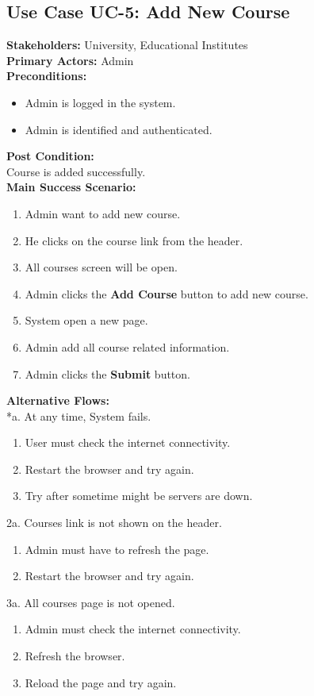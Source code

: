 \subsection{Use Case UC-5: Add New Course}
\textbf{Stakeholders: } University, Educational Institutes \\
\textbf{Primary Actors: } Admin \\
\textbf{Preconditions:}
\begin{itemize}
\item Admin is logged in the system.
\item Admin is identified and authenticated.
\end{itemize}
\textbf{Post Condition: }\\
Course is added successfully.\\
\textbf{Main Success Scenario:}
\begin{enumerate}
\item Admin want to add new course.
\item He clicks on the course link from the header.
\item All courses screen will be open.
\item Admin clicks the \textbf{Add Course} button to add new course.
\item System open a new page.
\item Admin add all course related information.
\item Admin clicks the \textbf{Submit} button. 
\end{enumerate}
\textbf{Alternative Flows:}\\
*a. At any time, System fails.
\begin{enumerate}
\item User must check the internet connectivity.
\item Restart the browser and try again.
\item Try after sometime might be servers are down.
\end{enumerate}
2a. Courses link is not shown on the header.
\begin{enumerate}
\item Admin must have to refresh the page.
\item Restart the browser and try again.
\end{enumerate} 
3a. All courses page is not opened.
\begin{enumerate}
\item Admin must check the internet connectivity.
\item Refresh the browser.
\item Reload the page and try again.
\end{enumerate}
